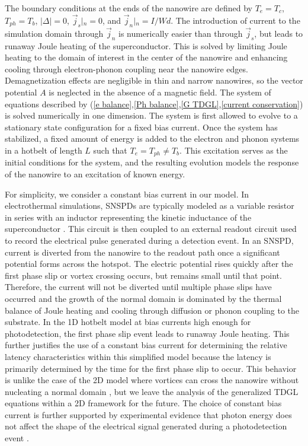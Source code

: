 \documentclass[%
reprint,
 amsmath,amssymb,
aps,
pra,
]{revtex4-1}
\begin{document}
\quad The boundary conditions at the ends of the nanowire are defined by 
\(T_e = T_c\), \(T_{ph} = T_b\), \(\left|\Delta\right| = 0\), \(\vec{j}_s\left|_n\right.=0\), and \(\vec{j}_n\left|_n\right.=I/Wd\).  The introduction of current to the simulation domain through \(\vec{j}_n\) is numerically easier than through \(\vec{j}_s\), but leads to runaway Joule heating of the superconductor.  This is solved by limiting Joule heating to the domain of interest in the center of the nanowire and enhancing cooling through electron-phonon coupling near the nanowire edges. Demagnetization effects are negligible in thin and narrow nanowires, so the vector potential \(A\) is neglected in the absence of a magnetic field.  The system of equations described by (\ref{e balance},\ref{Ph balance},\ref{G TDGL},\ref{current conservation}) is solved numerically in one dimension.  The system is first allowed to evolve to a stationary state configuration for a fixed bias current.  Once the system has stabilized, a fixed amount of energy is added to the electron and phonon systems in a hotbelt of length \(L\) such that \(T_e = T_{ph} \neq T_b \).  This excitation serves as the initial conditions for the system, and the resulting evolution models the response of the nanowire to an excitation of known energy.

\quad For simplicity, we consider a constant bias current in our model.  In electrothermal simulations, SNSPDs are typically modeled as a variable resistor in series with an inductor representing the kinetic inductance of the superconductor \cite{yang_modeling_2007}.  This circuit is then coupled to an external readout circuit used to record the electrical pulse generated during a detection event.  In an SNSPD, current is diverted from the nanowire to the readout path once a significant potential forms across the hotspot.  The electric potential rises quickly after the first phase slip or vortex crossing occurs, but remains small until that point.  Therefore, the current will not be diverted until multiple phase slips have occurred and the growth of the normal domain is dominated by the thermal balance of Joule heating and cooling through diffusion or phonon coupling to the substrate.  In the 1D hotbelt model at bias currents high enough for photodetection, the first phase slip event leads to runaway Joule heating.  This further justifies the use of a constant bias current for determining the relative latency characteristics within this simplified model because the latency is primarily determined by the time for the first phase slip to occur.  This behavior is unlike the case of the 2D model where vortices can cross the nanowire without nucleating a normal domain \cite{vodolazov_single-photon_2017}, but we leave the analysis of the generalized TDGL equations within a 2D framework for the future.  The choice of constant bias current is further supported by experimental evidence that photon energy does not affect the shape of the electrical signal generated during a photodetection event \cite{korzh_demonstrating_2018}.
\end{document}
